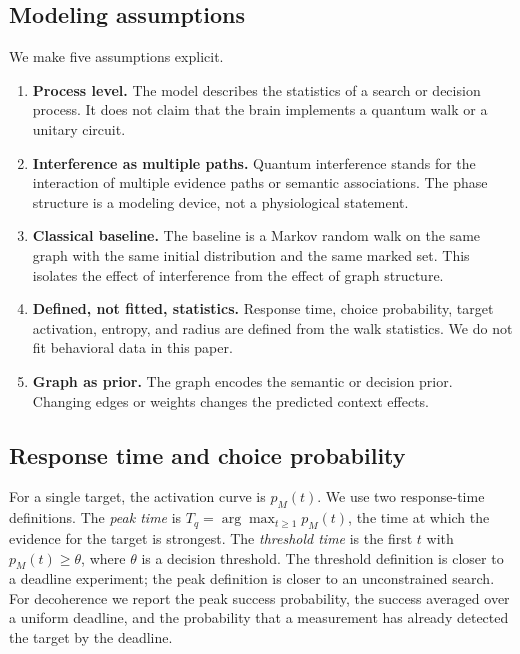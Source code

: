 \subsection{Modeling assumptions}
\label{sec:cognitive-assumptions}

We make five assumptions explicit.
\begin{enumerate}[leftmargin=1.4em]
  \item \textbf{Process level.} The model describes the statistics of a search
  or decision process. It does not claim that the brain implements a quantum
  walk or a unitary circuit.
  \item \textbf{Interference as multiple paths.} Quantum interference stands
  for the interaction of multiple evidence paths or semantic associations. The
  phase structure is a modeling device, not a physiological statement.
  \item \textbf{Classical baseline.} The baseline is a Markov random walk on
  the same graph with the same initial distribution and the same marked set.
  This isolates the effect of interference from the effect of graph structure.
  \item \textbf{Defined, not fitted, statistics.} Response time, choice
  probability, target activation, entropy, and radius are defined from the walk
  statistics. We do not fit behavioral data in this paper.
  \item \textbf{Graph as prior.} The graph encodes the semantic or decision
  prior. Changing edges or weights changes the predicted context effects.
\end{enumerate}

\subsection{Response time and choice probability}
\label{sec:cognitive-rt}

For a single target, the activation curve is $p_M(t)$. We use two response-time
definitions. The \emph{peak time} is
$T_q=\arg\max_{t\ge1}p_M(t)$, the time at which the evidence for the target is
strongest. The \emph{threshold time} is the first $t$ with
$p_M(t)\ge\theta$, where $\theta$ is a decision threshold. The threshold
definition is closer to a deadline experiment; the peak definition is closer to
an unconstrained search. For decoherence we report the peak success
probability, the success averaged over a uniform deadline, and the probability
that a measurement has already detected the target by the deadline.

